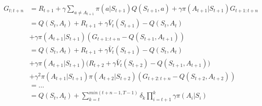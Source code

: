 \documentclass[12pt,a4paper]{article}
\begin{document}
\begin{enumerate}
    \begin{align*}
      G_{t: t + n} &= R_{t + 1} + \gamma \sum\limits_{a \neq A_{t + 1}} \pi(a|S_{t + 1})
      Q(S_{t + 1}, a) + \gamma \pi(A_{t + 1}|S_{t + 1}) G_{t + 1: t + n}\\
      &= Q(S_t, A_t) + R_{t + 1} + \gamma \bar{V}_t(S_{t + 1}) - Q(S_t, A_t)\\
      &+ \gamma \pi (A_{t + 1}|S_{t + 1})(G_{t + 1: t + n} - Q(S_{t + 1}, A_{t + 1}))\\
      &= Q(S_t, A_t) + R_{t + 1} + \gamma \bar{V}_t(S_{t + 1}) - Q(S_t, A_t)\\
      &+ \gamma \pi (A_{t + 1}|S_{t + 1}) \Big(R_{t + 2} + \gamma \bar{V}_t(S_{t + 2}) - Q(S_{t + 1}, A_{t + 1})\Big)\\
      &+ \gamma^2 \pi (A_{t + 1}|S_{t + 1}) \pi(A_{t + 2}|S_{t + 2}) (G_{t + 2: t + n}
      - Q(S_{t + 2}, A_{t + 2}))\\
      &= \dots\\
      &= Q(S_t, A_t) + \sum\limits_{k = t}^{min(t + n - 1, T - 1)}
      \delta_k \prod\limits_{i = t + 1}^k \gamma \pi(A_i|S_i)
    \end{align*}

\end{enumerate}
\end{document}
